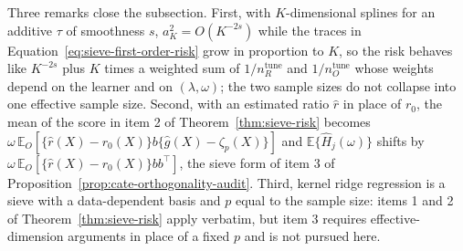 Three remarks close the subsection. First, with $K$-dimensional splines for an additive $\tau$ of smoothness $s$, $a_K^2=O(K^{-2s})$ while the traces in Equation~\eqref{eq:sieve-first-order-risk} grow in proportion to $K$, so the risk behaves like $K^{-2s}$ plus $K$ times a weighted sum of $1/n_R^{\mathrm{tune}}$ and $1/n_O^{\mathrm{tune}}$ whose weights depend on the learner and on $(\lambda,\omega)$; the two sample sizes do not collapse into one effective sample size. Second, with an estimated ratio $\widehat r$ in place of $r_0$, the mean of the score in item 2 of Theorem~\ref{thm:sieve-risk} becomes $\omega\,\mathbb E_O[\{\widehat r(X)-r_0(X)\}b\{\widehat g(X)-\zeta_p(X)\}]$ and $\mathbb E\{\widehat H_j(\omega)\}$ shifts by $\omega\,\mathbb E_O[\{\widehat r(X)-r_0(X)\}bb^\top]$, the sieve form of item 3 of Proposition~\ref{prop:cate-orthogonality-audit}. Third, kernel ridge regression is a sieve with a data-dependent basis and $p$ equal to the sample size: items 1 and 2 of Theorem~\ref{thm:sieve-risk} apply verbatim, but item 3 requires effective-dimension arguments in place of a fixed $p$ and is not pursued here.
